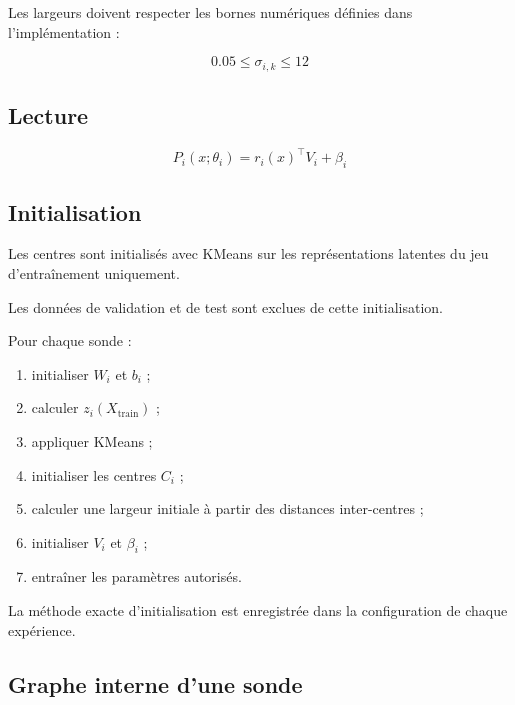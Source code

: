 \documentclass[11pt,a4paper]{article}
\begin{document}
Les largeurs doivent respecter les bornes numériques
définies dans l'implémentation :

\[
0.05\leq\sigma_{i,k}\leq12
\]

\subsection{Lecture}

\[
P_i(x;\theta_i)
=
r_i(x)^\top V_i+\beta_i
\]

\subsection{Initialisation}

Les centres sont initialisés avec KMeans sur les
représentations latentes du jeu d'entraînement uniquement.

Les données de validation et de test sont exclues
de cette initialisation.

Pour chaque sonde :
\begin{enumerate}
    \item initialiser $W_i$ et $b_i$ ;
    \item calculer $z_i(X_{\mathrm{train}})$ ;
    \item appliquer KMeans ;
    \item initialiser les centres $C_i$ ;
    \item calculer une largeur initiale à partir
    des distances inter-centres ;
    \item initialiser $V_i$ et $\beta_i$ ;
    \item entraîner les paramètres autorisés.
\end{enumerate}

La méthode exacte d'initialisation est enregistrée
dans la configuration de chaque expérience.

\subsection{Graphe interne d'une sonde}
\end{document}
